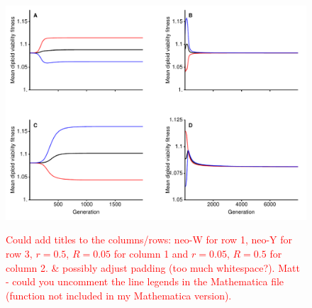 \documentclass[12pt]{article}
\begin{document}
\begin{figure}
\centering
\includegraphics[width=\linewidth]{Combination_MeanFit}\\
\caption{
\textcolor{red}{Could add titles to the columns/rows: neo-W for row 1, neo-Y for row 3, $r=0.5$, $R=0.05$ for column 1 and $r=0.05$, $R=0.5$ for column 2. \& possibly adjust padding (too much whitespace?). Matt - could you uncomment the line legends in the Mathematica file (function not included in my Mathematica version).}
}
\label{fig:Combination_MeanFit}
\end{figure}
\end{document}
